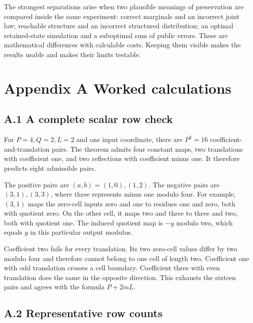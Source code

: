 \documentclass[
]{article}
\begin{document}
The strongest separations arise when two plausible meanings of
preservation are compared inside the same experiment: correct marginals
and an incorrect joint law; reachable structure and an incorrect
structured distribution; an optimal retained-state simulation and a
suboptimal sum of public errors. These are mathematical differences with
calculable costs. Keeping them visible makes the results usable and
makes their limits testable.

\section{Appendix A Worked
calculations}\label{appendix-a-worked-calculations}

\subsection{A.1 A complete scalar row
check}\label{a.1-a-complete-scalar-row-check}

For \(P=4,Q=2,L=2\) and one input coordinate, there are \(P^2=16\)
coefficient-and-translation pairs. The theorem admits four constant
maps, two translations with coefficient one, and two reflections with
coefficient minus one. It therefore predicts eight admissible pairs.

The positive pairs are \((a,b)=(1,0),(1,2)\). The negative pairs are
\((3,1),(3,3)\), where three represents minus one modulo four. For
example, \((3,1)\) maps the zero-cell inputs zero and one to residues
one and zero, both with quotient zero. On the other cell, it maps two
and three to three and two, both with quotient one. The induced quotient
map is \(-y\) modulo two, which equals \(y\) in this particular output
modulus.

Coefficient two fails for every translation. Its two zero-cell values
differ by two modulo four and therefore cannot belong to one cell of
length two. Coefficient one with odd translation crosses a cell
boundary. Coefficient three with even translation does the same in the
opposite direction. This exhausts the sixteen pairs and agrees with the
formula \(P+2mL\).

\subsection{A.2 Representative row
counts}\label{a.2-representative-row-counts}
\end{document}
